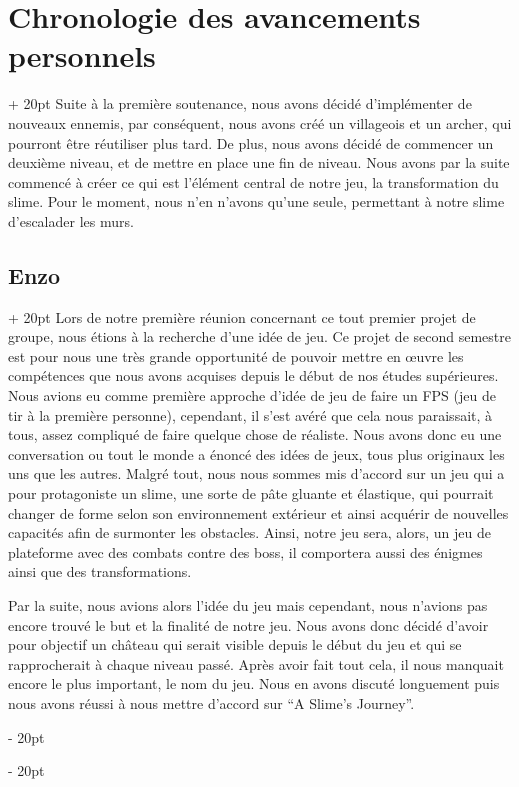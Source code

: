\documentclass[a4paper, 12pt, twoside]{article}
\newcommand{\ind}[1][20pt]{\advance\leftskip + #1}
\newcommand{\deind}[1][20pt]{\advance\leftskip - #1}
\newenvironment{indt}[2][20pt]{#2 \par \ind[#1]}{\par \deind} %
\begin{document}
    \begin{indt}{\section{Chronologie des avancements personnels}}
        Suite à la première soutenance, nous avons décidé d'implémenter de nouveaux ennemis, par conséquent, nous avons créé un villageois et un archer, qui pourront être réutiliser plus tard. De plus, nous avons décidé de commencer un deuxième niveau, et de mettre en place une fin de niveau. Nous avons par la suite commencé à créer ce qui est l'élément central de notre jeu, la transformation du slime. Pour le moment, nous n'en n'avons qu'une seule, permettant à notre slime d'escalader les murs.
        
        \begin{indt}{\subsection{Enzo}}
            Lors de notre première réunion concernant ce tout premier projet de groupe, nous étions à la recherche d'une idée de jeu. Ce projet de second semestre est pour nous une très grande opportunité de pouvoir mettre en œuvre les compétences que nous avons acquises depuis le début de nos études supérieures. Nous avions eu comme première approche d'idée  de jeu de faire un FPS (jeu de tir à la première personne), cependant, il s'est avéré que cela nous paraissait, à tous, assez compliqué de faire quelque chose de réaliste. Nous avons donc eu une conversation ou tout le monde a énoncé des idées de jeux, tous plus originaux les uns que les autres. Malgré tout, nous nous sommes mis d'accord sur un jeu qui a pour protagoniste un slime, une sorte de pâte gluante et élastique, qui pourrait changer de forme selon son environnement extérieur et ainsi acquérir de nouvelles capacités afin de surmonter les obstacles. Ainsi, notre jeu sera, alors, un jeu de plateforme avec des combats contre des boss, il comportera aussi des énigmes ainsi que des transformations.

            Par la suite, nous avions alors l'idée du jeu mais cependant, nous n'avions pas encore trouvé le but et la finalité de notre jeu. Nous avons donc décidé d'avoir pour objectif un château qui serait visible depuis le début du jeu et qui se rapprocherait à chaque niveau passé. Après avoir fait tout cela, il nous manquait encore le plus important, le nom du jeu. Nous en avons discuté longuement puis nous avons réussi à nous mettre d'accord sur “A Slime's Journey”.
        	

\end{indt}
\end{indt}
\end{document}

